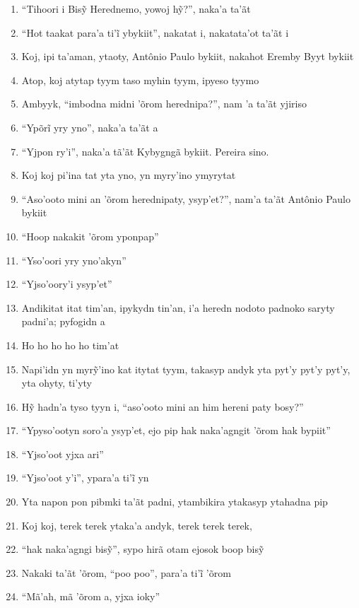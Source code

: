 \begin{enumerate}
 \item ``Tihoori i Bisỹ Herednemo, yowoj hỹ?'', naka’a ta’ãt
 \item ``Hot taakat para’a ti’ĩ ybykiit'', nakatat i, nakatata’ot ta’ãt i
 \item Koj, ipi ta'aman, ytaoty, Antônio Paulo bykiit, nakahot Eremby Byyt bykiit
 \item Atop, koj atytap tyym taso myhin tyym, ipyeso tyymo
 \item Ambyyk, ``imbodna midni 'õrom herednipa?'', nam 'a ta'ãt yjiriso
 \item ``Ypõrĩ yry yno'', naka’a ta’ãt a
 \item ``Yjpon ry'i'', naka'a tã'ãt Kybygngã bykiit. Pereira sino.
 \item Koj koj pi'ina tat yta yno, yn myry'ino ymyrytat
 \begin{center}\end{center}
 \item ``Aso'ooto mini an 'õrom herednipaty, ysyp'et?'', nam'a ta'ãt
 Antônio Paulo bykiit
 \item ``Hoop nakakit 'õrom yponpap''
 \item ``Yso'oori yry yno'akyn''
 \item ``Yjso'oory'i ysyp'et''
 \item Andikitat itat tim'an, ipykydn tin'an, i'a heredn nodoto padnoko
 saryty padni'a; pyfogidn a
 \item Ho ho ho ho ho tim'at
 \item Napi’idn yn myrỹ’ino kat itytat tyym, takasyp andyk yta pyt’y pyt’y pyt’y, yta ohyty, ti’yty
 \item Hỹ hadn’a tyso tyyn i, ``aso’ooto mini an him hereni paty bosy?''
 \item ``Ypyso'ootyn soro'a ysyp'et, ejo pip hak naka'agngit 'õrom hak
 bypiit''
 \item ``Yjso'oot yjxa ari''
 \item ``Yjso’oot y’i'', ypara’a ti’ĩ yn
 \item Yta napon pon pibmki ta'ãt padni, ytambikira ytakasyp ytahadna pip
 \begin{center}\end{center}
 \item Koj koj, terek terek ytaka'a andyk, terek terek terek,
 \item ``hak naka’agngi bisỹ'', sypo hirã otam ejosok boop bisỹ
 \item Nakaki ta’ãt ’õrom, ``poo poo'', para’a ti’ĩ ’õrom
 \item ``Mã'ah, mã 'õrom a, yjxa ioky''

\end{enumerate}
